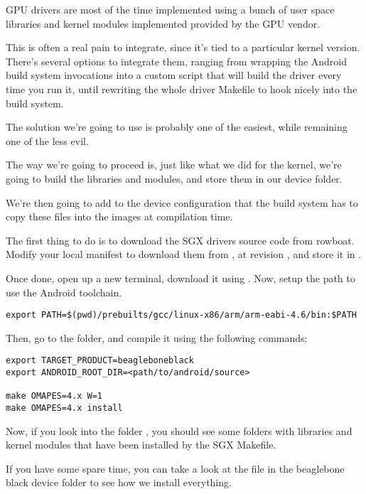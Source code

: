 GPU drivers are most of the time implemented using a bunch of
user space libraries and kernel modules implemented provided by the GPU
vendor.

This is often a real pain to integrate, since it's tied to a
particular kernel version. There's several options to integrate them,
ranging from wrapping the Android build system invocations into a
custom script that will build the driver every time you run it, until
rewriting the whole driver Makefile to hook nicely into the build
system.

The solution we're going to use is probably one of the easiest, while
remaining one of the less evil.

The way we're going to proceed is, just like what we did for the
kernel, we're going to build the libraries and modules, and store them
in our device folder.

We're then going to add to the device configuration that the build
system has to copy these files into the images at compilation time.

The first thing to do is to download the SGX drivers source code from
rowboat. Modify your local manifest to download them from
,
at revision , and store it in
.

Once done, open up a new terminal, download it using . Now,
setup the path to use the Android toolchain.

\begin{verbatim}
export PATH=$(pwd)/prebuilts/gcc/linux-x86/arm/arm-eabi-4.6/bin:$PATH
\end{verbatim}

Then, go to the  folder, and compile it using the following
commands:

\begin{verbatim}
export TARGET_PRODUCT=beagleboneblack
export ANDROID_ROOT_DIR=<path/to/android/source>

make OMAPES=4.x W=1
make OMAPES=4.x install
\end{verbatim}

Now, if you look into the folder ,
you should see some folders with libraries and kernel modules that
have been installed by the SGX Makefile.

If you have some spare time, you can take a look at the file
 in the beaglebone black device folder to see how
we install everything.


